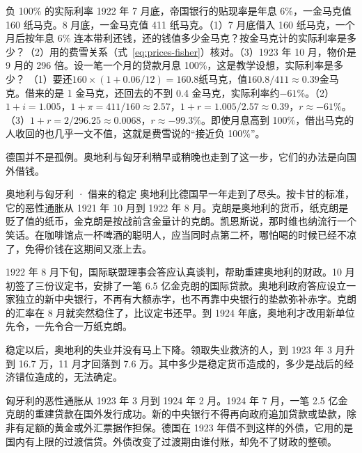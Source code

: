 \begin{example}{负 100\% 的实际利率}\label{ex:weimar-realrate}
1922 年 7 月底，帝国银行的贴现率是年息 6\%，一金马克值 160 纸马克。8 月底，一金马克值 411 纸马克\cite{bresciani1937}。（1）7 月底借入 160 纸马克，一个月后按年息 6\% 连本带利还钱，还的钱值多少金马克？按金马克计的实际利率是多少？（2）用的费雪关系（式~\eqref{eq:prices-fisher}）核对。（3）1923 年 10 月，物价是 9 月的 296 倍。设一笔一个月的贷款月息 100\%，这是教学设想，实际利率是多少？
\solution （1）要还$160\times(1+0.06/12)=160.8$纸马克，值$160.8/411\approx0.39$金马克。借来的是 1 金马克，还回去的不到 0.4 金马克，实际利率约$-61\%$。（2）$1+i=1.005$，$1+\pi=411/160\approx2.57$，$1+r=1.005/2.57\approx0.39$，$r\approx-61\%$。（3）$1+r=2/296.25\approx0.0068$，$r\approx-99.3\%$。即使月息高到 100\%，借出马克的人收回的也几乎一文不值，这就是费雪说的“接近负 100\%”\cite{fisher1930}。
\end{example}

德国并不是孤例。奥地利与匈牙利稍早或稍晚也走到了这一步，它们的办法是向国外借钱。

\begin{case}{奥地利与匈牙利 · 借来的稳定}
奥地利比德国早一年走到了尽头。按卡甘的标准，它的恶性通胀从 1921 年 10 月到 1922 年 8 月\cite{fischer2002}。克朗是奥地利的货币，纸克朗是贬了值的纸币，金克朗是按战前含金量计的克朗。凯恩斯说，那时维也纳流行一个笑话。在咖啡馆点一杯啤酒的聪明人，应当同时点第二杯，哪怕喝的时候已经不凉了，免得价钱在这期间又涨上去\cite{keynes1923}。

1922 年 8 月下旬，国际联盟理事会答应认真谈判，帮助重建奥地利的财政。10 月初签了三份议定书，安排了一笔 6.5 亿金克朗的国际贷款\cite{sargent1982}。奥地利政府答应设立一家独立的新中央银行，不再有大额赤字，也不再靠中央银行的垫款弥补赤字\cite{sargent1982}。克朗的汇率在 8 月就突然稳住了，比议定书还早。到 1924 年底，奥地利才改用新单位先令，一先令合一万纸克朗\cite{sargent1982}。

稳定以后，奥地利的失业并没有马上下降。领取失业救济的人，到 1923 年 3 月升到 16.7 万，11 月才回落到 7.6 万。其中多少是稳定货币造成的，多少是战后的经济错位造成的，无法确定\cite{sargent1982}。

匈牙利的恶性通胀从 1923 年 3 月到 1924 年 2 月\cite{fischer2002}。1924 年 7 月，一笔 2.5 亿金克朗的重建贷款在国外发行成功。新的中央银行不得再向政府追加贷款或垫款，除非有足额的黄金或外汇票据作担保\cite{sargent1982}。德国在 1923 年借不到这样的外债\cite{bresciani1937}，它用的是国内有上限的过渡信贷。外债改变了过渡期由谁付账，却免不了财政的整顿。
\end{case}

